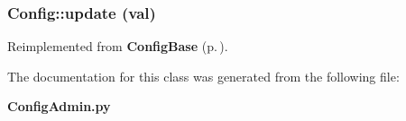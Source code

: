 \subsubsection{\setlength{\rightskip}{0pt plus 5cm}Config::update (val)}\label{classConfig_Configa1}




Reimplemented from {\bf Config\-Base} {\rm (p.\,\pageref{classConfigBase_ConfigBasea1})}.

The documentation for this class was generated from the following file:\begin{CompactItemize}
\item 
{\bf Config\-Admin.py}\end{CompactItemize}
